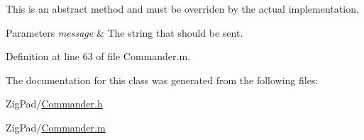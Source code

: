 This is an abstract method and must be overriden by the actual implementation.


\begin{DoxyParams}{Parameters}
{\em message} & The string that should be sent. \\
\hline
\end{DoxyParams}


Definition at line 63 of file Commander.m.



The documentation for this class was generated from the following files:\begin{DoxyCompactItemize}
\item 
ZigPad/\hyperlink{_commander_8h}{Commander.h}\item 
ZigPad/\hyperlink{_commander_8m}{Commander.m}\end{DoxyCompactItemize}
